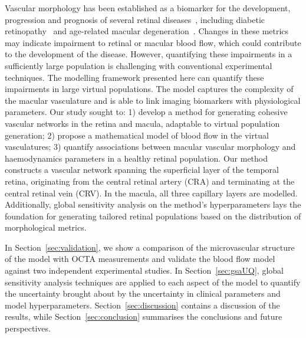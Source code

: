 \documentclass[11pt,]{article}
\begin{document}
Vascular morphology has been established as a biomarker for the development, progression and prognosis of several retinal diseases~\cite{Balaratnasingam_2023,Yao_2020}, including diabetic retinopathy~\cite{Garg2022,Hein_2023} and age-related macular degeneration~\cite{Told2023,Narnaware_2023}.
Changes in these metrics may indicate impairment to retinal or macular blood flow, which could contribute to the development of the disease.
However, quantifying these impairments in a sufficiently large population is challenging with conventional experimental techniques.
The modelling framework presented here can quantify these impairments in large virtual populations.
The model captures the complexity of the macular vasculature and is able to link imaging biomarkers with physiological parameters.
Our study sought to: 1) develop a method for generating cohesive vascular networks in the retina and macula, adaptable to virtual population generation;
2) propose a mathematical model of blood flow in the virtual vasculatures;
3) quantify associations between macular vascular morphology and haemodynamics parameters in a healthy retinal population.
Our method constructs a vascular network spanning the superficial layer of the temporal retina, originating from the central retinal artery (CRA) and terminating at the central retinal vein (CRV).
In the macula, all three capillary layers are modelled.
Additionally, global sensitivity analysis on the method's hyperparameters lays the foundation for generating tailored retinal populations based on the distribution of morphological metrics.

In Section~\ref{sec:validation}, we show a comparison of the microvascular structure of the model with OCTA measurements and validate the blood flow model against two independent experimental studies.
In Section~\ref{sec:gsaUQ}, global sensitivity analysis techniques are applied to each aspect of the model to quantify the uncertainty brought about by the uncertainty in clinical parameters and model hyperparameters.
Section~\ref{sec:discussion} contains a discussion of the results, while Section~\ref{sec:conclusion} summarises the conclusions and future perspectives.
\end{document}
